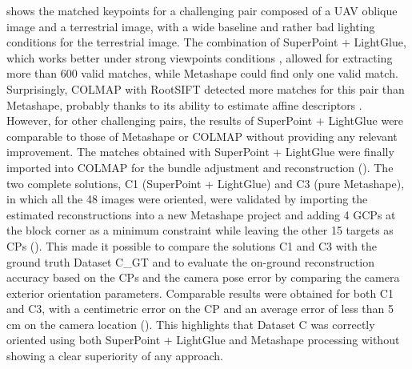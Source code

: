  shows the matched keypoints for a challenging pair composed of a UAV oblique image and a terrestrial image, with a wide baseline and rather bad lighting conditions for the terrestrial image. 
The combination of SuperPoint + LightGlue, which works better under strong viewpoints conditions \citep{ioli2024deep}, allowed for extracting more than 600 valid matches, while Metashape could find only one valid match.
Surprisingly, COLMAP with RootSIFT detected more matches for this pair than Metashape, probably thanks to its ability to estimate affine descriptors \cite{Lindeberg1997_affine}. 
However, for other challenging pairs, the results of SuperPoint + LightGlue were comparable to those of Metashape or COLMAP without providing any relevant improvement. The matches obtained with SuperPoint + LightGlue were finally imported into COLMAP for the bundle adjustment and reconstruction ().
The two complete solutions, C1 (SuperPoint + LightGlue) and C3 (pure Metashape), in which all the 48 images were oriented, were validated by importing the estimated reconstructions into a new Metashape project and adding 4 GCPs at the block corner as a minimum constraint while leaving the other 15 targets as CPs (). 
This made it possible to compare the solutions C1 and C3 with the ground truth Dataset C\_GT and to evaluate the on-ground reconstruction accuracy based on the CPs and the camera pose error by comparing the camera exterior orientation parameters.
Comparable results were obtained for both C1 and C3, with a centimetric error on the CP and an average error of less than 5 cm on the camera location (). 
This highlights that Dataset C was correctly oriented using both SuperPoint + LightGlue and Metashape processing without showing a clear superiority of any approach. 

